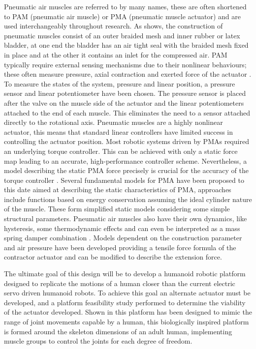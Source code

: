 \documentclass[11pt,a4paper]{article}
\begin{document}
Pneumatic air muscles are referred to by many names, these are often shortened to PAM (pneumatic air muscle) or PMA (pneumatic muscle actuator) and are used interchangeably throughout research. As  shows, the construction of pneumatic muscles consist of an outer braided mesh and inner rubber or latex bladder, at one end the bladder has an air tight seal with the braided mesh fixed in place and at the other it contains an inlet for the compressed air. PAM typically require external sensing mechanisms due to their nonlinear behaviours; these often measure pressure, axial contraction and exerted force of the actuator \cite{erin_pol_valle_park_2016}. To measure the states of the system, pressure and linear position, a pressure sensor and linear potentiometer have been chosen. The pressure sensor is placed after the valve on the muscle side of the actuator and the linear potentiometers attached to the end of each muscle. This eliminates the need to a sensor attached directly to the rotational axis. Pneumatic muscles are a highly nonlinear actuator, this means that standard linear controllers have limited success in controlling the actuator position. Most robotic systems driven by PMAs required an underlying torque controller. This can be achieved with only a static force map leading to an accurate, high-performance controller scheme. Nevertheless, a model describing the static PMA force precisely is crucial for the accuracy of the torque controller \cite{martens_boblan_2017}. Several fundamental models for PMA have been proposed to this date aimed at describing the static characteristics of PMA, approaches include functions based on energy conservation assuming the ideal cylinder nature of the muscle. These form simplified static models considering some simple structural parameters. Pneumatic air muscles also have their own dynamics, like hysteresis, some thermodynamic effects and can even be interpreted as a mass spring damper combination \cite{martens_boblan_2017}. Models dependent on the construction parameter and air pressure have been developed providing a tensile force formula of the contractor actuator and can be modified to describe the extension force.\newline

The ultimate goal of this design  will be to develop a humanoid robotic platform designed to replicate the motions of a human closer than the current electric servo driven humanoid robots. To achieve this goal an alternate actuator must be developed, and a platform feasibility study performed to determine the viability of the actuator developed. Shown in  this platform has been designed to mimic the range of joint movements capable by a human, this biologically inspired platform is formed around the skeleton dimensions of an adult human, implementing muscle groups to control the joints for each degree of freedom. \newline
\end{document}

